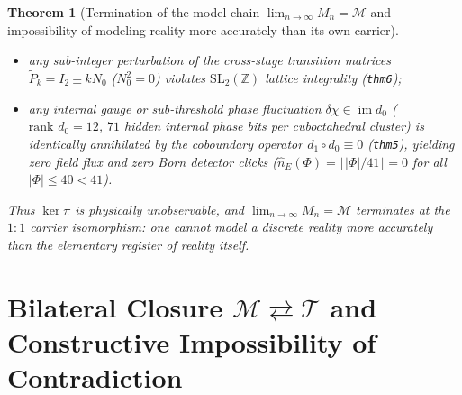 \documentclass[11pt,a4paper]{article}
\newtheorem{theorem}{Theorem}[section]
\theoremstyle{definition}
\theoremstyle{remark}
\begin{document}
\begin{theorem}[Termination of the model chain $\lim_{n\to\infty} M_n = \mathcal{M}$ and impossibility of modeling reality more accurately than its own carrier]
\begin{enumerate}[label=\textbf{(\roman*)},leftmargin=*]
  \begin{itemize}[noitemsep]
  \item any sub-integer perturbation of the cross-stage transition matrices $\widetilde{P}_k = I_2 \pm k N_0$ ($N_0^2 = 0$) violates $\mathrm{SL}_2(\mathbb{Z})$ lattice integrality (\texttt{thm6});
  \item any internal gauge or sub-threshold phase fluctuation $\delta\chi \in \operatorname{im} d_0$ ($\text{rank } d_0 = 12$, $71$ hidden internal phase bits per cuboctahedral cluster) is identically annihilated by the coboundary operator $d_1\circ d_0 \equiv 0$ (\texttt{thm5}), yielding zero field flux and zero Born detector clicks ($\hat{n}_E(\Phi) = \lfloor|\Phi|/41\rfloor = 0$ for all $|\Phi|\le 40 < 41$).
  \end{itemize}
  Thus $\ker\pi$ is physically unobservable, and $\lim_{n\to\infty} M_n = \mathcal{M}$ terminates at the $1:1$ carrier isomorphism: \emph{one cannot model a discrete reality more accurately than the elementary register of reality itself}.
\end{enumerate}
\end{theorem}

\section{Bilateral Closure $\mathcal{M} \rightleftarrows \mathcal{T}$ and Constructive Impossibility of Contradiction}
\label{sec:bilateral-closure}
\end{document}
